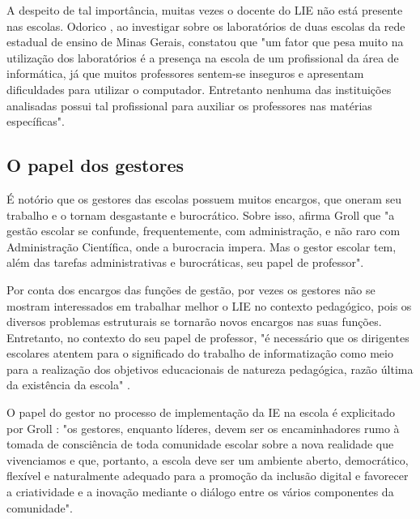 A despeito de tal importância, muitas vezes o docente do LIE não está presente nas escolas. Odorico \cite{art:REF_ART_ODORICO}, ao investigar sobre os laboratórios de duas escolas da rede estadual de ensino de Minas Gerais, constatou que "um fator que pesa muito na utilização dos laboratórios é a presença na escola de um profissional da área de informática, já que muitos professores sentem-se inseguros e apresentam dificuldades para utilizar o computador. Entretanto nenhuma das instituições analisadas possui tal profissional para auxiliar os professores nas matérias específicas".

\subsection{O papel dos gestores}\label{sec:LABEL_CHP_REF_TEO_SEC_RES_GEST}

É notório que os gestores das escolas possuem muitos encargos, que oneram seu trabalho e o tornam desgastante e burocrático. Sobre isso, afirma Groll \cite{art:REF_TCC_GROLL} que "a gestão escolar se confunde, frequentemente, com administração, e não raro com Administração Científica, onde a burocracia impera. Mas o gestor escolar tem, além das tarefas administrativas e burocráticas, seu papel de professor".

Por conta dos encargos das funções de gestão, por vezes os gestores não se mostram interessados em trabalhar melhor o LIE no contexto pedagógico, pois os diversos problemas estruturais se tornarão novos encargos nas suas funções. Entretanto, no contexto do seu papel de professor, "é necessário que os dirigentes escolares atentem para o significado do trabalho de informatização como meio para a realização dos objetivos educacionais de natureza pedagógica, razão última da existência da escola" \cite{art:REF_TCC_GROLL}.

O papel do gestor no processo de implementação da IE na escola é explicitado por Groll \cite{art:REF_TCC_GROLL}: "os gestores, enquanto líderes, devem ser os encaminhadores rumo à tomada de consciência de toda comunidade escolar sobre a nova realidade que vivenciamos e que, portanto, a escola deve ser um ambiente aberto, democrático, flexível e naturalmente adequado para a promoção da inclusão digital e favorecer a criatividade e a inovação mediante o diálogo entre os vários componentes da comunidade".

